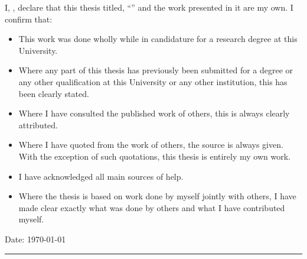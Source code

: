 \begin{declaration}
\addchaptertocentry{\authorshipname} %
\noindent I, \authorname, declare that this thesis titled, \enquote{\ttitle} and the work presented in it are my own. I confirm that:

\begin{itemize} 
\item This work was done wholly while in candidature for a research degree at this University.
\item Where any part of this thesis has previously been submitted for a degree or any other qualification at this University or any other institution, this has been clearly stated.
\item Where I have consulted the published work of others, this is always clearly attributed.
\item Where I have quoted from the work of others, the source is always given. With the exception of such quotations, this thesis is entirely my own work.
\item I have acknowledged all main sources of help.
\item Where the thesis is based on work done by myself jointly with others, I have made clear exactly what was done by others and what I have contributed myself.
\end{itemize}
 
 
\noindent Date: \today\\
\rule[0.5em]{25em}{0.5pt} %
\end{declaration}

\cleardoublepage